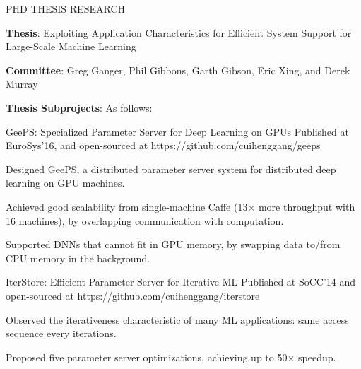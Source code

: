 \documentclass{resume} %
\begin{document}
\begin{rSection}{PHD THESIS RESEARCH}

\hspace{-1em} \textbf{Thesis}: Exploiting Application Characteristics for Efficient System Support for Large-Scale Machine Learning
\vspace{-.1in}
\begin{list}{\enskip\textbullet}{\leftmargin=2em}
\item \textbf{Committee}: Greg Ganger, Phil Gibbons, Garth Gibson, Eric Xing, and Derek Murray
\vspace{-.1in}
\item \textbf{Thesis Subprojects}: As follows:
\end{list}

\begin{rSubsection}{\hspace{-1em} GeePS: Specialized Parameter Server for Deep Learning on GPUs}{}
{Published at EuroSys'16, and open-sourced at https://github.com/cuihenggang/geeps}{}
\vspace{-0.3em}
\item Designed GeePS, a distributed parameter server system for distributed deep learning on GPU machines.
\item Achieved good scalability from single-machine Caffe (13$\times$ more throughput with 16 machines), by overlapping communication with computation.
\item Supported DNNs that cannot fit in GPU memory, by swapping data to/from CPU memory in the background.
\end{rSubsection}
\vspace{-.1in}

\begin{rSubsection}{\hspace{-1em} IterStore: Efficient Parameter Server for Iterative ML}{}
{Published at SoCC'14 and open-sourced at https://github.com/cuihenggang/iterstore}{}
\vspace{-0.3em}
\item Observed the iterativeness characteristic of many ML applications: same access sequence every iterations.
\item Proposed five parameter server optimizations, achieving up to 50$\times$ speedup.
\end{rSubsection}
\vspace{-.1in}


\end{rSection}
\end{document}
